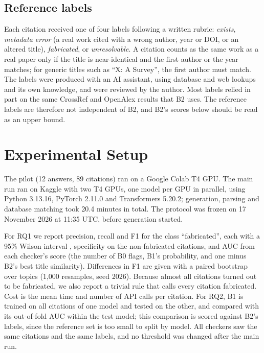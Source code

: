 \documentclass[10pt,twocolumn]{article}
\begin{document}
\subsection{Reference labels}
Each citation received one of four labels following a written rubric: \emph{exists}, \emph{metadata error} (a real work cited with a wrong author, year or DOI, or an altered title), \emph{fabricated}, or \emph{unresolvable}. A citation counts as the same work as a real paper only if the title is near-identical and the first author or the year matches; for generic titles such as ``X: A Survey'', the first author must match. The labels were produced with an AI assistant, using database and web lookups and its own knowledge, and were reviewed by the author. Most labels relied in part on the same CrossRef and OpenAlex results that B2 uses. The reference labels are therefore not independent of B2, and B2's scores below should be read as an upper bound.

\section{Experimental Setup}
The pilot (12 answers, 89 citations) ran on a Google Colab T4 GPU. The main run ran on Kaggle with two T4 GPUs, one model per GPU in parallel, using Python 3.13.16, PyTorch 2.11.0 and Transformers 5.20.2; generation, parsing and database matching took 20.4 minutes in total. The protocol was frozen on 17 November 2026 at 11:35 UTC, before generation started.

For RQ1 we report precision, recall and F1 for the class ``fabricated'', each with a 95\% Wilson interval \citep{wilson1927}, specificity on the non-fabricated citations, and AUC from each checker's score (the number of B0 flags, B1's probability, and one minus B2's best title similarity). Differences in F1 are given with a paired bootstrap over topics (1,000 resamples, seed 2026). Because almost all citations turned out to be fabricated, we also report a trivial rule that calls every citation fabricated. Cost is the mean time and number of API calls per citation. For RQ2, B1 is trained on all citations of one model and tested on the other, and compared with its out-of-fold AUC within the test model; this comparison is scored against B2's labels, since the reference set is too small to split by model. All checkers saw the same citations and the same labels, and no threshold was changed after the main run.
\end{document}
